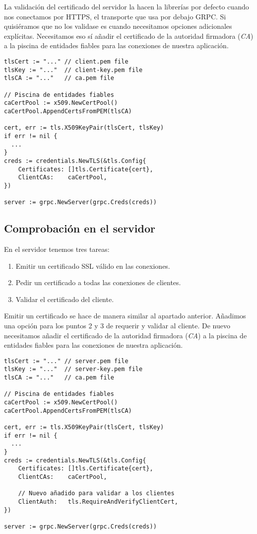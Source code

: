 La validación del certificado del servidor la hacen la librerías por defecto cuando nos conectamos por HTTPS, el transporte que usa por debajo GRPC. Si quisiéramos que no los validase es cuando necesitamos opciones adicionales explícitas. Necesitamos eso sí añadir el certificado de la autoridad firmadora (\emph{CA}) a la piscina de entidades fiables para las conexiones de nuestra aplicación.

\begin{verbatim}
tlsCert := "..." // client.pem file
tlsKey := "..."  // client-key.pem file
tlsCA := "..."   // ca.pem file

// Piscina de entidades fiables
caCertPool := x509.NewCertPool()
caCertPool.AppendCertsFromPEM(tlsCA)

cert, err := tls.X509KeyPair(tlsCert, tlsKey)
if err != nil {
  ...
}
creds := credentials.NewTLS(&tls.Config{
	Certificates: []tls.Certificate{cert},
	ClientCAs:    caCertPool,
})

server := grpc.NewServer(grpc.Creds(creds))
\end{verbatim}

\subsection{Comprobación en el servidor}

En el servidor tenemos tres tareas:
\begin{enumerate}
    \item Emitir un certificado SSL válido en las conexiones.
    \item Pedir un certificado a todas las conexiones de clientes.
    \item Validar el certificado del cliente.
\end{enumerate}

Emitir un certificado se hace de manera similar al apartado anterior. Añadimos una opción para los puntos 2 y 3 de requerir y validar al cliente. De nuevo necesitamos añadir el certificado de la autoridad firmadora (\emph{CA}) a la piscina de entidades fiables para las conexiones de nuestra aplicación.

\begin{verbatim}
tlsCert := "..." // server.pem file
tlsKey := "..."  // server-key.pem file
tlsCA := "..."   // ca.pem file

// Piscina de entidades fiables
caCertPool := x509.NewCertPool()
caCertPool.AppendCertsFromPEM(tlsCA)

cert, err := tls.X509KeyPair(tlsCert, tlsKey)
if err != nil {
  ...
}
creds := credentials.NewTLS(&tls.Config{
	Certificates: []tls.Certificate{cert},
	ClientCAs:    caCertPool,
	
	// Nuevo añadido para validar a los clientes
	ClientAuth:   tls.RequireAndVerifyClientCert,
})

server := grpc.NewServer(grpc.Creds(creds))
\end{verbatim}
